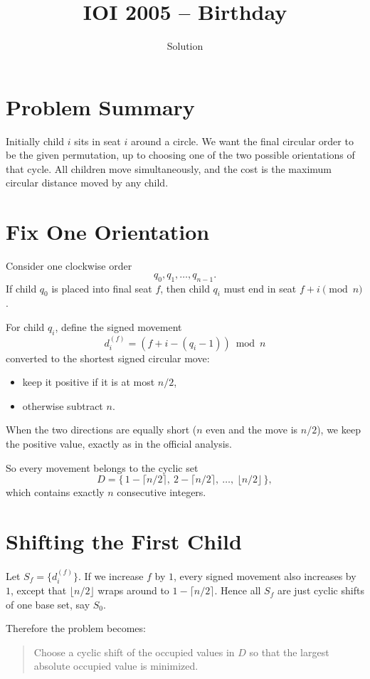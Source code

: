 \documentclass[11pt,a4paper]{article}
\title{IOI 2005 -- Birthday}
\author{Solution}
\date{}
\begin{document}
\maketitle

\section{Problem Summary}
Initially child $i$ sits in seat $i$ around a circle.
We want the final circular order to be the given permutation, up to choosing one of the two possible
orientations of that cycle.
All children move simultaneously, and the cost is the maximum circular distance moved by any child.

\section{Fix One Orientation}
Consider one clockwise order
\[
q_0, q_1, \dots, q_{n-1}.
\]
If child $q_0$ is placed into final seat $f$, then child $q_i$ must end in seat $f+i \pmod n$.

For child $q_i$, define the signed movement
\[
d_i^{(f)} = (f+i-(q_i-1)) \bmod n
\]
converted to the shortest signed circular move:
\begin{itemize}
  \item keep it positive if it is at most $n/2$,
  \item otherwise subtract $n$.
\end{itemize}
When the two directions are equally short ($n$ even and the move is $n/2$), we keep the positive
value, exactly as in the official analysis.

So every movement belongs to the cyclic set
\[
D = \{\,1-\lceil n/2 \rceil,\ 2-\lceil n/2 \rceil,\ \dots,\ \lfloor n/2 \rfloor\,\},
\]
which contains exactly $n$ consecutive integers.

\section{Shifting the First Child}
Let $S_f = \{d_i^{(f)}\}$.
If we increase $f$ by $1$, every signed movement also increases by $1$, except that
$\lfloor n/2 \rfloor$ wraps around to $1-\lceil n/2 \rceil$.
Hence all $S_f$ are just cyclic shifts of one base set, say $S_0$.

Therefore the problem becomes:
\begin{quote}
Choose a cyclic shift of the occupied values in $D$ so that the largest absolute occupied value is
minimized.
\end{quote}
\end{document}
